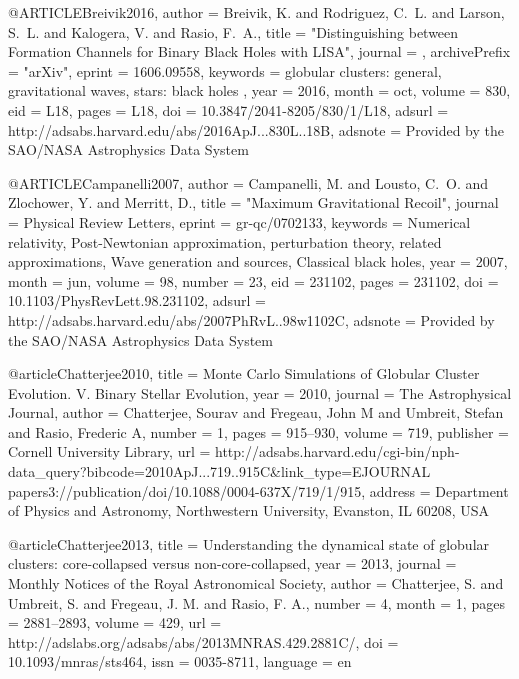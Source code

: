 \documentclass[twocolumn,tighten]{aastex63}
\begin{document}
{{{{{@ARTICLE{Breivik2016,
   author = {{Breivik}, K. and {Rodriguez}, C.~L. and {Larson}, S.~L. and 
	{Kalogera}, V. and {Rasio}, F.~A.},
    title = "{Distinguishing between Formation Channels for Binary Black Holes with LISA}",
  journal = {\apjl},
archivePrefix = "arXiv",
   eprint = {1606.09558},
 keywords = {globular clusters: general, gravitational waves, stars: black holes },
     year = 2016,
    month = oct,
   volume = 830,
      eid = {L18},
    pages = {L18},
      doi = {10.3847/2041-8205/830/1/L18},
   adsurl = {http://adsabs.harvard.edu/abs/2016ApJ...830L..18B},
  adsnote = {Provided by the SAO/NASA Astrophysics Data System}
}

@ARTICLE{Campanelli2007,
   author = {{Campanelli}, M. and {Lousto}, C.~O. and {Zlochower}, Y. and 
	{Merritt}, D.},
    title = "{Maximum Gravitational Recoil}",
  journal = {Physical Review Letters},
   eprint = {gr-qc/0702133},
 keywords = {Numerical relativity, Post-Newtonian approximation, perturbation theory, related approximations, Wave generation and sources, Classical black holes},
     year = 2007,
    month = jun,
   volume = 98,
   number = 23,
      eid = {231102},
    pages = {231102},
      doi = {10.1103/PhysRevLett.98.231102},
   adsurl = {http://adsabs.harvard.edu/abs/2007PhRvL..98w1102C},
  adsnote = {Provided by the SAO/NASA Astrophysics Data System}
}

@article{Chatterjee2010,
    title = {{Monte Carlo Simulations of Globular Cluster Evolution. V. Binary Stellar Evolution}},
    year = {2010},
    journal = {The Astrophysical Journal},
    author = {Chatterjee, Sourav and Fregeau, John M and Umbreit, Stefan and Rasio, Frederic A},
    number = {1},
    pages = {915--930},
    volume = {719},
    publisher = {Cornell University Library},
    url = {http://adsabs.harvard.edu/cgi-bin/nph-data_query?bibcode=2010ApJ...719..915C&link_type=EJOURNAL papers3://publication/doi/10.1088/0004-637X/719/1/915},
    address = {Department of Physics and Astronomy, Northwestern University, Evanston, IL 60208, USA}
}

@article{Chatterjee2013,
    title = {{Understanding the dynamical state of globular clusters: core-collapsed versus non-core-collapsed}},
    year = {2013},
    journal = {Monthly Notices of the Royal Astronomical Society},
    author = {Chatterjee, S. and Umbreit, S. and Fregeau, J. M. and Rasio, F. A.},
    number = {4},
    month = {1},
    pages = {2881--2893},
    volume = {429},
    url = {http://adslabs.org/adsabs/abs/2013MNRAS.429.2881C/},
    doi = {10.1093/mnras/sts464},
    issn = {0035-8711},
    language = {en}
}

}}}}}
\end{document}
